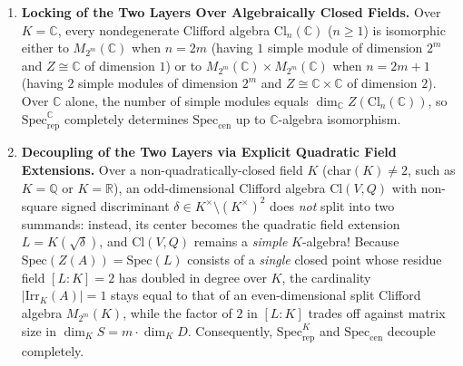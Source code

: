\documentclass[11pt,a4paper]{article}
\theoremstyle{plain}
\theoremstyle{definition}
\newcommand{\Cl}{\mathrm{Cl}}
\newcommand{\Irr}{\mathrm{Irr}}
\newcommand{\Specrep}{\mathrm{Spec}_{\mathrm{rep}}}
\newcommand{\Speccen}{\mathrm{Spec}_{\mathrm{cen}}}
\newcommand{\Spec}{\mathrm{Spec}}
\newcommand{\Mat}{M}
\newcommand{\Q}{\mathbb{Q}}
\newcommand{\R}{\mathbb{R}}
\newcommand{\C}{\mathbb{C}}
\begin{document}
\begin{enumerate}
  \item \textbf{Locking of the Two Layers Over Algebraically Closed Fields.}
  Over $K = \C$, every nondegenerate Clifford algebra $\Cl_n(\C)$ ($n \ge 1$) is isomorphic either to $\Mat_{2^m}(\C)$ when $n = 2m$ (having $1$ simple module of dimension $2^m$ and $Z \cong \C$ of dimension $1$) or to $\Mat_{2^m}(\C) \times \Mat_{2^m}(\C)$ when $n = 2m+1$ (having $2$ simple modules of dimension $2^m$ and $Z \cong \C \times \C$ of dimension $2$). Over $\C$ alone, the number of simple modules equals $\dim_\C Z(\Cl_n(\C))$, so $\Specrep^\C$ completely determines $\Speccen$ up to $\C$-algebra isomorphism.

  \item \textbf{Decoupling of the Two Layers via Explicit Quadratic Field Extensions.}
  Over a non-quadratically-closed field $K$ ($\mathrm{char}(K) \neq 2$, such as $K = \Q$ or $K = \R$), an odd-dimensional Clifford algebra $\Cl(V,Q)$ with non-square signed discriminant $\delta \in K^\times \setminus (K^\times)^2$ does \emph{not} split into two summands: instead, its center becomes the quadratic field extension $L = K(\sqrt{\delta})$, and $\Cl(V,Q)$ remains a \emph{simple} $K$-algebra! Because $\Spec(Z(A)) = \Spec(L)$ consists of a \emph{single} closed point whose residue field $[L:K]=2$ has doubled in degree over $K$, the cardinality $|\Irr_K(A)| = 1$ stays equal to that of an even-dimensional split Clifford algebra $\Mat_{2^m}(K)$, while the factor of $2$ in $[L:K]$ trades off against matrix size in $\dim_K S = m \cdot \dim_K D$. Consequently, $\Specrep^K$ and $\Speccen$ decouple completely.
\end{enumerate}
\end{document}
